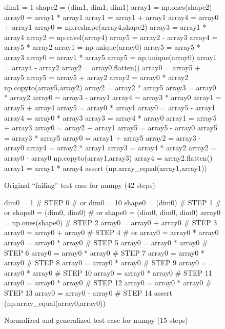 \begin{figure}
{\scriptsize
\begin{code}
 dim1 = 1 
 shape2 = (dim1, dim1, dim1) 
 array1 = np.ones(shape2) 
 array0 = array1 * array1 
 array1 = array1 + array1 
 array4 = array0 + array1 
 array0 = np.reshape(array4,shape2) 
 array3 = array1 * array4 
 array2 = np.ravel(array4) 
 array5 = array2 - array3 
 array4 = array5 * array2 
 array1 = np.unique(array0) 
 array5 = array5 * array3 
 array0 = array1 * array5 
 array5 = np.unique(array0) 
 array1 = array4 - array2 
 array2 = array0.flatten() 
 array0 = array5 + array5 
 array5 = array5 + array2 
 array2 = array0 * array2 
 np.copyto(array5,array2) 
 array2 = array2 * array5 
 array3 = array0 * array2 
 array0 = array3 - array1 
 array4 = array3 * array0 
 array1 = array5 + array4 
 array5 = array0 * array1 
 array0 = array5 - array1 
 array4 = array0 * array3 
 array3 = array4 * array0 
 array1 = array5 + array3 
 array0 = array2 + array1 
 array5 = array5 - array0 
 array5 = array3 * array5 
 array0 = array1 + array5 
 array2 = array3 - array0 
 array4 = array2 * array1 
 array3 = array4 * array2 
 array2 = array0 - array0 
 np.copyto(array1,array3) 
 array4 = array2.flatten() 
 array1 = array1 * array4
 assert (np.array\_equal(array1,array1))
\end{code}
}
\caption{Original ``failing'' test case for numpy (42 steps)}
\label{numpyorig}
\end{figure}

\begin{figure}
{\scriptsize
\begin{code}
dim0 = 1                            \textcolor{black!45}{\# STEP 0}
\textcolor{black!45}{\#  or dim0 = 10 }
shape0 = (dim0)                     \textcolor{black!45}{\# STEP 1}
\textcolor{black!45}{\#  or shape0 = (dim0, dim0) }
\textcolor{black!45}{\#  or shape0 = (dim0, dim0, dim0) }
array0 = np.ones(shape0)            \textcolor{black!45}{\# STEP 2}
array0 = array0 + array0            \textcolor{black!45}{\# STEP 3}
array0 = array0 + array0            \textcolor{black!45}{\# STEP 4}
\textcolor{black!45}{\#  or array0 = array0 * array0 }
array0 = array0 * array0            \textcolor{black!45}{\# STEP 5}
array0 = array0 * array0            \textcolor{black!45}{\# STEP 6}
array0 = array0 * array0            \textcolor{black!45}{\# STEP 7}
array0 = array0 * array0            \textcolor{black!45}{\# STEP 8}
array0 = array0 * array0            \textcolor{black!45}{\# STEP 9}
array0 = array0 * array0            \textcolor{black!45}{\# STEP 10}
array0 = array0 * array0            \textcolor{black!45}{\# STEP 11}
array0 = array0 * array0            \textcolor{black!45}{\# STEP 12}
array0 = array0 * array0            \textcolor{black!45}{\# STEP 13}
array0 = array0 - array0            \textcolor{black!45}{\# STEP 14}
assert (np.array\_equal(array0,array0))
\end{code}
}
\caption{Normalized and generalized test case for numpy (15 steps)}
\label{numpynormgen}
\end{figure}


